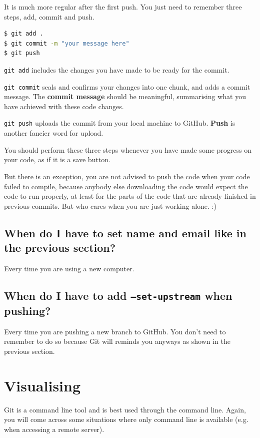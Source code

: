 It is much more regular after the first push. You just need to remember three steps, add, commit and push.

\begin{lstlisting}[language=bash]
$ git add .
$ git commit -m "your message here"
$ git push
\end{lstlisting}

\texttt{git add} includes the changes you have made to be ready for the commit. 

\texttt{git commit} seals and confirms your changes into one chunk, and adds a commit message. The \textbf{commit message} should be meaningful, summarising what you have achieved with these code changes.

\texttt{git push} uploads the commit from your local machine to GitHub. \textbf{Push} is another fancier word for upload.
\vspace{6mm}

You should perform these three steps whenever you have made some progress on your code, as if it is a save button.

But there is an exception, you are not advised to push the code when your code failed to compile, because anybody else downloading the code would expect the code to run properly, at least for the parts of the code that are already finished in previous commits. But who cares when you are just working alone. :)

\subsection*{When do I have to set name and email like in the previous section?}

Every time you are using a new computer.

\subsection*{When do I have to add \texttt{--set-upstream} when pushing?}

Every time you are pushing a new branch to GitHub. You don't need to remember to do so because Git will reminds you anyways as shown in the previous section.

\section{Visualising}
\label{sec:sublime}
Git is a command line tool and is best used through the command line. Again, you will come across some situations where only command line is available (e.g. when accessing a remote server). 

